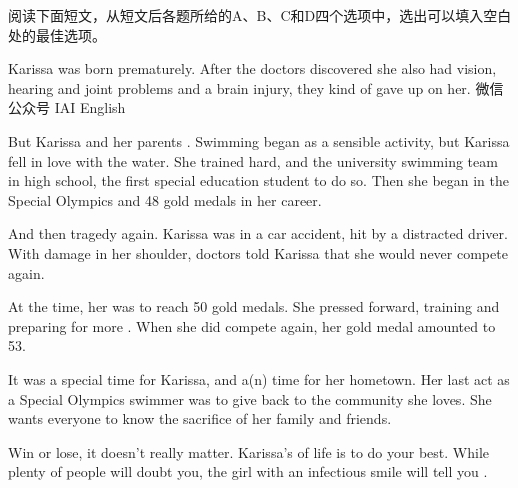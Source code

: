 \documentclass{英语试卷}
\begin{document}
\par 阅读下面短文，从短文后各题所给的A、B、C和D四个选项中，选出可以填入空白处的最佳选项。\par
\par Karissa was born prematurely. After the doctors discovered she also had vision, hearing and joint problems and  a brain injury, they kind of gave up on her. 微信公众号 IAI English\par
\par But Karissa and her parents . Swimming began as a sensible  activity, but Karissa fell in love with the water. She trained hard, and  the university swimming team in high school, the first special education student to do so. Then she began  in the Special Olympics and  48 gold medals in her career.\par
\par And then tragedy  again. Karissa was in a car accident, hit by a distracted driver. With  damage in her shoulder, doctors told Karissa that she would never compete again.\par
\par At the time, her  was to reach 50 gold medals. She pressed forward, training and preparing for more . When she did compete again, her gold medal  amounted to 53.\par
\par It was a special time for Karissa, and a(n)  time for her hometown. Her last act as a Special Olympics swimmer was to give back to the community she loves. She wants everyone to know the  sacrifice of her family and friends.\par
\par Win or lose, it doesn't really matter. Karissa's  of life is to do your best. While plenty of people will doubt you, the girl with an infectious smile will tell you .\par
{}
\end{document}
